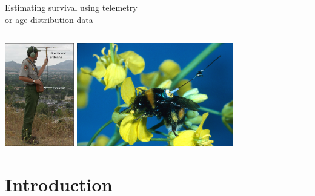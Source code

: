 \documentclass[color=usenames,dvipsnames]{beamer}\usepackage[]{graphicx}\usepackage[]{color}
\begin{document}

\begin{frame}[plain]
  \begin{center}
    {\huge Estimating survival using telemetry \\ 
      or age distribution data \\}%
    {\color{blue} \rule{\textwidth}{0.1pt}}
    \vfill
    \includegraphics[height=4.5cm,keepaspectratio]{figs/radiotelemetry} %
    \hspace{0.5cm}
      \includegraphics[height=4.5cm,keepaspectratio]{figs/bbee}
  \end{center}
\end{frame}




\section{Introduction}
\end{document}
